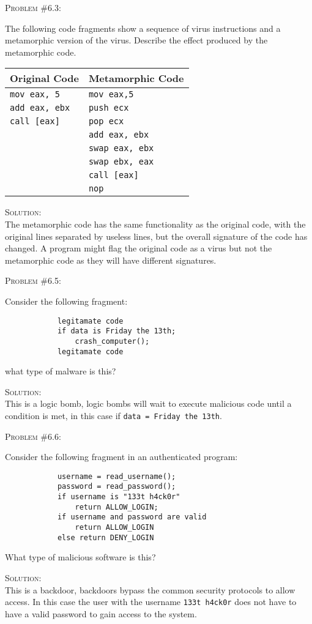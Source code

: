\documentclass[12pt]{article}
\newenvironment{problem}[1]
{\begin{mdframed}[linewidth=0.8pt]
        \textsc{Problem #1:}

}
    {\end{mdframed}}
\newenvironment{solution}
    {\textsc{Solution:}\\}
    {\newpage}%
\begin{document}
	\begin{problem}{\#6.3}
		The following code fragments show a sequence of virus instructions and a metamorphic version of the virus. Describe the effect produced by the metamorphic code.\\
		\begin{center}
		\begin{tabular}{|l|l|}
			\hline
			\textbf{Original Code} & \textbf{Metamorphic Code}\\
			\hline
			\verb|mov eax, 5| & \verb|mov eax,5|\\
			\verb|add eax, ebx| & \verb|push ecx|\\
			\verb|call [eax]| & \verb|pop ecx|\\
				   & \verb|add eax, ebx|\\
				   & \verb|swap eax, ebx|\\
				   & \verb|swap ebx, eax|\\
				   & \verb|call [eax]|\\
				   & \verb|nop|\\
			\hline
		\end{tabular}
		\end{center}
	\end{problem}
	\begin{solution}
		The metamorphic code has the same functionality as the original code, with the original lines separated by useless lines, but the overall signature of the code has changed. A program might flag the original code as a virus but not the metamorphic code as they will have different signatures.
	\end{solution}

	\begin{problem}{\#6.5}
		Consider the following fragment:
		\begin{verbatim}
			legitamate code
			if data is Friday the 13th;
			    crash_computer();
			legitamate code
		\end{verbatim}
		what type of malware is this?
	\end{problem}
	\begin{solution}
		This is a logic bomb, logic bombs will wait to execute malicious code until a condition is met, in this case if \verb|data = Friday the 13th|.
	\end{solution}

	\begin{problem}{\#6.6}
		Consider the following fragment in an authenticated program:
		\begin{verbatim}
			username = read_username();
			password = read_password();
			if username is "133t h4ck0r"
			    return ALLOW_LOGIN;
			if username and password are valid
			    return ALLOW_LOGIN
			else return DENY_LOGIN
		\end{verbatim}
		What type of malicious software is this?
	\end{problem}
	\begin{solution}
		This is a backdoor, backdoors  bypass the common security protocols to allow access. In this case the user with the username \verb|133t h4ck0r| does not have to have a valid password to gain access to the system.
	\end{solution}
\end{document}
